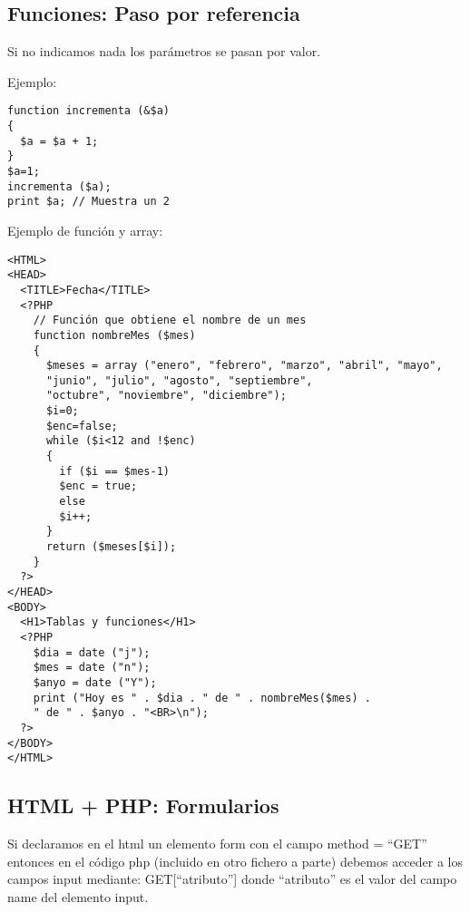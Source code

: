 \documentclass{apuntes}
\begin{document}
\newpage
\subsection{Funciones: Paso por referencia}
Si no indicamos nada los parámetros se pasan por valor.

Ejemplo:
\begin{verbatim}
function incrementa (&$a)
{
  $a = $a + 1;
}
$a=1;
incrementa ($a);
print $a; // Muestra un 2
\end{verbatim}

Ejemplo de función y array:

\begin{verbatim}
<HTML>
<HEAD>
  <TITLE>Fecha</TITLE>
  <?PHP
    // Función que obtiene el nombre de un mes
    function nombreMes ($mes)
    {
      $meses = array ("enero", "febrero", "marzo", "abril", "mayo",
      "junio", "julio", "agosto", "septiembre",
      "octubre", "noviembre", "diciembre");
      $i=0;
      $enc=false;
      while ($i<12 and !$enc)
      {
        if ($i == $mes-1)
        $enc = true;
        else
        $i++;
      }
      return ($meses[$i]);
    }
  ?>
</HEAD>
<BODY>
  <H1>Tablas y funciones</H1>
  <?PHP
    $dia = date ("j");
    $mes = date ("n");
    $anyo = date ("Y");
    print ("Hoy es " . $dia . " de " . nombreMes($mes) .
    " de " . $anyo . "<BR>\n");
  ?>
</BODY>
</HTML>
\end{verbatim}

\subsection{HTML + PHP: Formularios}
Si declaramos en el html un elemento form con el campo method = “GET” entonces en el código php (incluido en otro fichero a parte) debemos acceder a los campos input mediante: GET[“atributo”] donde “atributo” es el valor del campo name del elemento input.
\end{document}
